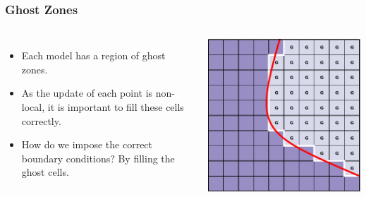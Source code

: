 \documentclass{beamer}
\begin{document}
\begin{frame}
\frametitle{Ghost Zones}
\begin{columns}
\begin{itemize}
\item{Each model has a region of ghost zones.}
\item{As the update of each point is non-local, it is important to fill these cells correctly.}
\item{How do we impose the correct boundary conditions? By filling the ghost cells.}
\end{itemize}
\includegraphics[width=\textwidth]{../images/multimodel_ghostcells.pdf}
\end{columns}
\end{frame}
\end{document}

